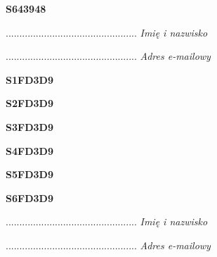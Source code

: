 \begin{turn}{90}\huge \textbf{S643948}\end{turn}

\begin{turn}{90}\begin{minipage}{\linewidth} \vspace{20mm} ................................................  \textit{Imię i nazwisko}\end{minipage}\end{turn}

\begin{turn}{90}\begin{minipage}{\linewidth} \vspace{20mm} ................................................  \textit{Adres e-mailowy}\end{minipage}\end{turn}

\begin{turn}{90}\huge \textbf{S1FD3D9}\end{turn}

\begin{turn}{90}\huge \textbf{S2FD3D9}\end{turn}

\begin{turn}{90}\huge \textbf{S3FD3D9}\end{turn}

\begin{turn}{90}\huge \textbf{S4FD3D9}\end{turn}

\begin{turn}{90}\huge \textbf{S5FD3D9}\end{turn}

\begin{turn}{90}\huge \textbf{S6FD3D9}\end{turn}

\begin{turn}{90}\begin{minipage}{\linewidth} \vspace{20mm} ................................................  \textit{Imię i nazwisko}\end{minipage}\end{turn}

\begin{turn}{90}\begin{minipage}{\linewidth} \vspace{20mm} ................................................  \textit{Adres e-mailowy}\end{minipage}\end{turn}

